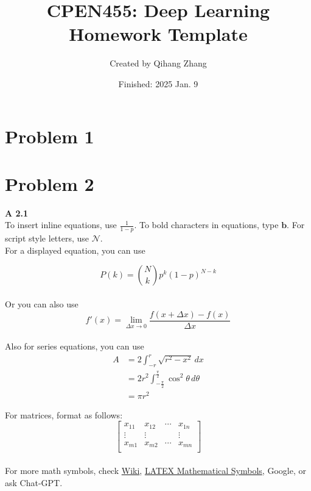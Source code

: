 \documentclass{article}
\title{CPEN455: Deep Learning \\ Homework Template}
\author{Created by 
Qihang Zhang}
\date{Finished: 2025 Jan. 9}
\begin{document}
\pagestyle{fancy}
\fancyhead{} %

\maketitle
\thispagestyle{fancy}


\section{Problem 1}

\section{Problem 2}
\noindent
\textbf{A 2.1}\\

\noindent
To insert inline equations, use $\frac{1}{1-p}$. To bold characters in equations, type $\mathbf{b}$. For script style letters, use $\mathcal{N}$.\\
\noindent
For a displayed equation, you can use

\begin{equation}
    P(k) = {N \choose k}p^{k}(1-p)^{N - k}
\end{equation}\\
Or you can also use 
$$
f'(x) = \lim_{\Delta x \to 0} \frac{f(x + \Delta x) - f(x)}{\Delta x}
$$\\
Also for series equations, you can use
\begin{align}
A &= 2 \int_{-r}^{r} \sqrt{r^2 - x^2} \, dx \\
  &= 2r^2 \int_{-\frac{\pi}{2}}^{\frac{\pi}{2}} \cos^2\theta \, d\theta \\
  &= \pi r^2 
\end{align}


\noindent
For matrices, format as follows:
\begin{equation}
    \begin{bmatrix}
    x_{11} & x_{12} & \cdots & x_{1n} \\
    \vdots & \vdots & & \vdots \\
    x_{m1} & x_{m2} & \cdots & x_{mn} \\
    \end{bmatrix}
\end{equation} \\

\noindent
For more math symbols, check \href{https://oeis.org/wiki/List_of_LaTeX_mathematical_symbols}{Wiki}, \href{https://www.cmor-faculty.rice.edu/~heinken/latex/symbols.pdf}{LATEX Mathematical Symbols}, Google, or ask Chat-GPT.\\
\end{document}
